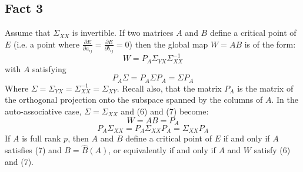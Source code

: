 \subsection{Fact 3}
Assume that $\Sigma_{XX}$ is invertible. If two matrices $A$ and $B$ define a critical point of $E$ (i.e. a point where $\frac{\partial E}{\partial a_{ij}} = \frac{\partial E}{\partial b_{ij}} = 0$) then the global map $W = AB$ is of the form:
\begin{equation} \tag{6}
    W = P_A \Sigma_{YX}\Sigma_{XX}^{-1}
\end{equation}
with $A$ satisfying
\begin{equation} \tag{7}
    P_A \Sigma = P_A \Sigma P_A = \Sigma P_A    
\end{equation}
Where $\Sigma = \Sigma_{YX} = \Sigma_{XX}^{-1} = \Sigma_{XY}$. Recall also, that the matrix $P_A$ is the matrix of the orthogonal projection onto the subspace spanned by the columns of $A$. In the auto-associative case, $\Sigma = \Sigma_{XX}$ and (6) and (7) become:
\begin{equation} \tag{6'}
    W = AB = P_A
\end{equation}
\begin{equation} \tag{7'}
    P_A \Sigma_{XX} = P_A \Sigma_{XX} P_A = \Sigma_{XX} P_A
\end{equation}
If $A$ is full rank $p$, then $A$ and $B$ define a critical point of $E$ if and only if $A$ satisfies (7) and $B = \hat{B}(A)$, or equivalently if and only if $A$ and $W$ satisfy (6) and (7).

